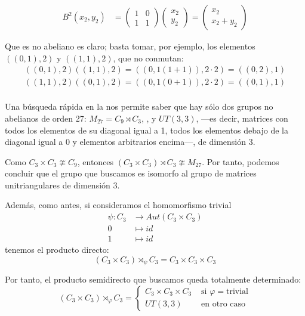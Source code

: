 \documentclass[a4paper, 11pt]{article}
\begin{document}
\begin{solucion}
\begin{align*}
        B^2(x_2,y_2) &= \left(
            \begin{array}{cc}
                1 & 0 \\
                1 & 1
            \end{array}
            \right) \left(
            \begin{array}{c}
                x_2 \\
                y_2
            \end{array}
            \right) = \left(
            \begin{array}{c}
                x_2 \\
                x_2+y_2
            \end{array}
            \right)
    \end{align*}

    Que es no abeliano es claro; basta tomar, por ejemplo, los elementos $((0,1),2)$ y $((1,1),2)$, que no conmutan:
    \begin{align*}
        ((0,1),2)((1,1),2) = ((0,1(1+1)),2\cdot2) = ((0,2),1) \\
        ((1,1),2)((0,1),2) = ((0,1(0+1)),2\cdot2) = ((0,1),1) \\
    \end{align*}

    Una búsqueda rápida en la  nos permite saber que hay sólo dos grupos no abelianos de orden 27: $M_{27} = C_9 \rtimes C_3$, , y $UT(3,3)$,  ---es decir, matrices con todos los elementos de su diagonal igual a 1, todos los elementos debajo de la diagonal igual a 0 y elementos arbitrarios encima---,  de dimensión 3.

    Como $C_3 \times C_3 \ncong C_9$, entonces $(C_3 \times C_3) \rtimes C_3 \ncong M_{27}$. Por tanto, podemos concluir que el grupo que buscamos es isomorfo al grupo de matrices unitriangulares de dimensión 3.

    Además, como antes, si consideramos el homomorfismo trivial
    \begin{align*}
        \psi : C_3 &\longrightarrow Aut(C_3 \times C_3) \\
        0 &\longmapsto id \\
        1 &\longmapsto id
    \end{align*}
    tenemos el producto directo:
    \[
    (C_3 \times C_3) \rtimes_{\psi} C_3 = C_3 \times C_3 \times C_3
    \]

    Por tanto, el producto semidirecto que buscamos queda totalmente determinado:
    \[
    (C_3 \times C_3) \rtimes_{\varphi} C_3 = \begin{cases}
      C_3 \times C_3 \times C_3 &\textrm{ si } \varphi = \textrm{trivial} \\
      UT(3,3) &\textrm{ en otro caso}
    \end{cases}
    \]
  \end{solucion}
\end{document}

